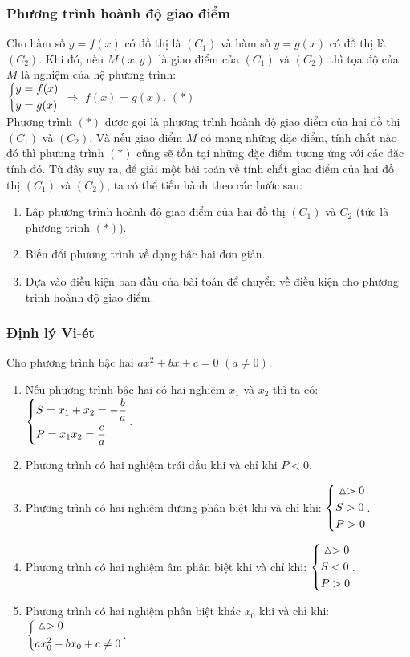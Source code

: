 \subsubsection{Phương trình hoành độ giao điểm}
    Cho hàm số $y=f(x)$ có đồ thị là $(C_1)$ và hàm số  $y=g(x)$ có đồ thị là $(C_2)$. Khi đó, nếu $M(x;y)$ là giao điểm của $(C_1)$ và $(C_2)$ thì tọa độ của $M$ là nghiệm của hệ phương trình: \\
    $\left\{\begin{aligned}&y=f(x)\\&y=g(x)\end{aligned}\right.$  $\Rightarrow$ $f(x) = g(x)$. $(*)$ \\
            Phương trình $(*)$ được gọi là phương trình hoành độ giao điểm của hai đồ thị $(C_1)$ và $(C_2)$. Và nếu giao điểm $M$ có mang những đặc điểm, tính chất nào đó thì phương trình $(*)$ cũng sẽ tồn tại những đặc điểm tương ứng với các đặc tính đó. Từ đây suy ra, để giải một bài toán về tính chất giao điểm của hai đồ thị $(C_1)$ và $(C_2)$, ta có thể tiến hành theo các bước sau:
    \begin{enumerate}
        \item Lập phương trình hoành độ giao điểm của hai đồ thị $(C_1)$ và $C_2$ (tức là phương trình $(*)$).
        \item Biến đổi phương trình về dạng bậc hai đơn giản.
        \item Dựa vào điều kiện ban đầu của bài toán để chuyển về điều kiện cho phương trình hoành độ giao điểm.
       \end{enumerate}
\subsubsection{Định lý Vi-ét}
\begin{dl}
    Cho phương trình bậc hai $ax^2+bx+c=0$ $(a \neq 0)$.
    \begin{enumerate}
        
        \item  Nếu phương trình bậc hai có hai nghiệm $x_1$ và $x_2$ thì ta có: 
        $\left\{\begin{aligned}&S= x_1 + x_2 = -\dfrac{b}{a}\\&P = x_1x_2 = \dfrac{c}{a}\end{aligned}\right.$.
        \item Phương trình có hai nghiệm trái dấu khi và chỉ khi $P < 0$.
        \item Phương trình có hai nghiệm dương phân biệt khi và chỉ khi: $\left\{\begin{aligned}&\vartriangle >0 \\ &S > 0 \\ &P>0\end{aligned}\right.$.
        \item Phương trình có hai nghiệm âm phân biệt khi và chỉ khi: $\left\{\begin{aligned}&\vartriangle >0 \\ &S < 0 \\ &P>0\end{aligned}\right.$.
        \item Phương trình có hai nghiệm phân biệt khác $x_0$ khi và chỉ khi: $\left\{\begin{aligned}&\vartriangle >0 \\ &ax_0^2 + bx_0 +c \neq 0\end{aligned}\right.$.
    \end{enumerate}
    
\end{dl}
